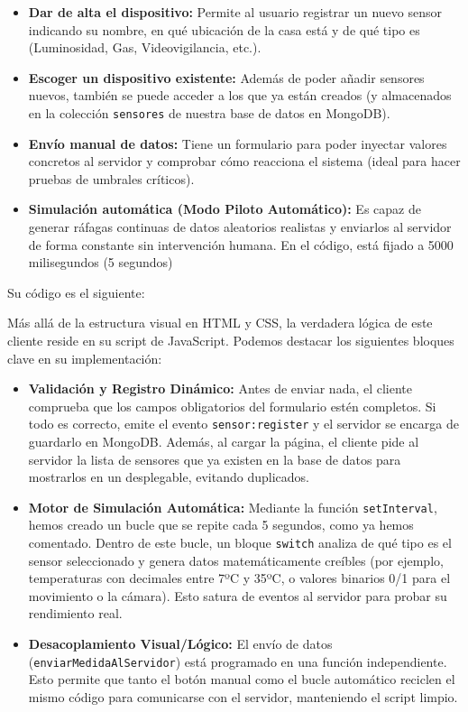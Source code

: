 \documentclass[a4paper,12pt]{article}
\begin{document}
				\begin{itemize}
					\item \textbf{Dar de alta el dispositivo:} Permite al usuario registrar un nuevo sensor indicando su nombre, en qué ubicación de la casa está y de qué tipo es (Luminosidad, Gas, Videovigilancia, etc.).
					\item \textbf{Escoger un dispositivo existente:} Además de poder añadir sensores nuevos, también se puede acceder a los que ya están creados (y almacenados en la colección \texttt{sensores} de nuestra base de datos en MongoDB).
					\item \textbf{Envío manual de datos:} Tiene un formulario para poder inyectar valores concretos al servidor y comprobar cómo reacciona el sistema (ideal para hacer pruebas de umbrales críticos).
					\item \textbf{Simulación automática (Modo Piloto Automático):} Es capaz de generar ráfagas continuas de datos aleatorios realistas y enviarlos al servidor de forma constante sin intervención humana. En el código, está fijado a 5000 milisegundos (5 segundos)
				\end{itemize}
				
				Su código es el siguiente:
				
				
				Más allá de la estructura visual en HTML y CSS, la verdadera lógica de este cliente reside en su script de JavaScript. Podemos destacar los siguientes bloques clave en su implementación:
				
				\begin{itemize}
					\item \textbf{Validación y Registro Dinámico:} Antes de enviar nada, el cliente comprueba que los campos obligatorios del formulario estén completos. Si todo es correcto, emite el evento \texttt{sensor:register} y el servidor se encarga de guardarlo en MongoDB. Además, al cargar la página, el cliente pide al servidor la lista de sensores que ya existen en la base de datos para mostrarlos en un desplegable, evitando duplicados.
					
					\item \textbf{Motor de Simulación Automática:} Mediante la función \texttt{setInterval}, hemos creado un bucle que se repite cada 5 segundos, como ya hemos comentado. Dentro de este bucle, un bloque \texttt{switch} analiza de qué tipo es el sensor seleccionado y genera datos matemáticamente creíbles (por ejemplo, temperaturas con decimales entre 7ºC y 35ºC, o valores binarios 0/1 para el movimiento o la cámara). Esto satura de eventos al servidor para probar su rendimiento real.
					
					\item \textbf{Desacoplamiento Visual/Lógico:} El envío de datos (\texttt{enviarMedidaAlServidor}) está programado en una función independiente. Esto permite que tanto el botón manual como el bucle automático reciclen el mismo código para comunicarse con el servidor, manteniendo el script limpio.
				\end{itemize}
\end{document}
